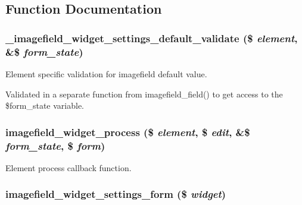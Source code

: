 \subsection{Function Documentation}
\hypertarget{imagefield__widget_8inc_c902595bd50fc51acc2abb4265472334}{
\subsubsection[{\_\-imagefield\_\-widget\_\-settings\_\-default\_\-validate}]{\setlength{\rightskip}{0pt plus 5cm}\_\-imagefield\_\-widget\_\-settings\_\-default\_\-validate (\$ {\em element}, \/  \&\$ {\em form\_\-state})}}
\label{imagefield__widget_8inc_c902595bd50fc51acc2abb4265472334}


Element specific validation for imagefield default value.

Validated in a separate function from imagefield\_\-field() to get access to the \$form\_\-state variable. \hypertarget{imagefield__widget_8inc_9bf0d34e0cb382ec9814b37edfcce5d7}{
\subsubsection[{imagefield\_\-widget\_\-process}]{\setlength{\rightskip}{0pt plus 5cm}imagefield\_\-widget\_\-process (\$ {\em element}, \/  \$ {\em edit}, \/  \&\$ {\em form\_\-state}, \/  \$ {\em form})}}
\label{imagefield__widget_8inc_9bf0d34e0cb382ec9814b37edfcce5d7}


Element process callback function. \hypertarget{imagefield__widget_8inc_8d7bbdfe64674cd66f47fbbe40c61bd1}{
\subsubsection[{imagefield\_\-widget\_\-settings\_\-form}]{\setlength{\rightskip}{0pt plus 5cm}imagefield\_\-widget\_\-settings\_\-form (\$ {\em widget})}}
\label{imagefield__widget_8inc_8d7bbdfe64674cd66f47fbbe40c61bd1}



